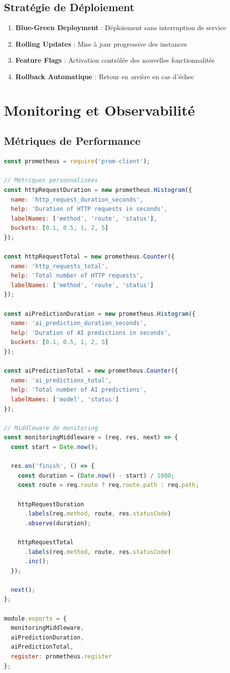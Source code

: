 \subsection{Stratégie de Déploiement}

\begin{enumerate}
    \item \textbf{Blue-Green Deployment} : Déploiement sans interruption de service
    \item \textbf{Rolling Updates} : Mise à jour progressive des instances
    \item \textbf{Feature Flags} : Activation contrôlée des nouvelles fonctionnalités
    \item \textbf{Rollback Automatique} : Retour en arrière en cas d'échec
\end{enumerate}

\section{Monitoring et Observabilité}

\subsection{Métriques de Performance}

\begin{lstlisting}[language=javascript, caption=Middleware de métriques Express.js]
const prometheus = require('prom-client');

// Métriques personnalisées
const httpRequestDuration = new prometheus.Histogram({
  name: 'http_request_duration_seconds',
  help: 'Duration of HTTP requests in seconds',
  labelNames: ['method', 'route', 'status'],
  buckets: [0.1, 0.5, 1, 2, 5]
});

const httpRequestTotal = new prometheus.Counter({
  name: 'http_requests_total',
  help: 'Total number of HTTP requests',
  labelNames: ['method', 'route', 'status']
});

const aiPredictionDuration = new prometheus.Histogram({
  name: 'ai_prediction_duration_seconds',
  help: 'Duration of AI predictions in seconds',
  buckets: [0.1, 0.5, 1, 2, 5]
});

const aiPredictionTotal = new prometheus.Counter({
  name: 'ai_predictions_total',
  help: 'Total number of AI predictions',
  labelNames: ['model', 'status']
});

// Middleware de monitoring
const monitoringMiddleware = (req, res, next) => {
  const start = Date.now();
  
  res.on('finish', () => {
    const duration = (Date.now() - start) / 1000;
    const route = req.route ? req.route.path : req.path;
    
    httpRequestDuration
      .labels(req.method, route, res.statusCode)
      .observe(duration);
    
    httpRequestTotal
      .labels(req.method, route, res.statusCode)
      .inc();
  });
  
  next();
};

module.exports = {
  monitoringMiddleware,
  aiPredictionDuration,
  aiPredictionTotal,
  register: prometheus.register
};
\end{lstlisting}

